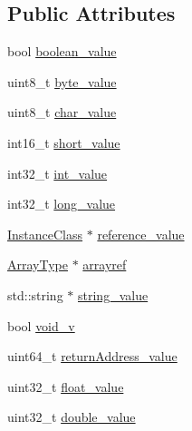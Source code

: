\subsection*{Public Attributes}
\begin{DoxyCompactItemize}
\item 
bool \hyperlink{unionLocal__var__Type__u_a8f386ab2284fc8e9828a136a9e15848b}{boolean\+\_\+value}
\item 
uint8\+\_\+t \hyperlink{unionLocal__var__Type__u_ad22519961e7ca09ba8135f4bab5cc677}{byte\+\_\+value}
\item 
uint8\+\_\+t \hyperlink{unionLocal__var__Type__u_ab245a6a8a84be391e7d1998b1eaf5f25}{char\+\_\+value}
\item 
int16\+\_\+t \hyperlink{unionLocal__var__Type__u_ac5a77877e9ddb59fe44eb9460facbec0}{short\+\_\+value}
\item 
int32\+\_\+t \hyperlink{unionLocal__var__Type__u_a26562ff158d1192e2caf14eebe1f2e51}{int\+\_\+value}
\item 
int32\+\_\+t \hyperlink{unionLocal__var__Type__u_a7968ab39ec644a73b48edc3d3c0886a5}{long\+\_\+value}
\item 
\hyperlink{classInstanceClass}{Instance\+Class} $\ast$ \hyperlink{unionLocal__var__Type__u_a5159fcf16992d633c01263fdebb6f00a}{reference\+\_\+value}
\item 
\hyperlink{heap_8hpp_aa630024ee56aa81525646e18ddf60284}{Array\+Type} $\ast$ \hyperlink{unionLocal__var__Type__u_aa8e32f1911fc076a74749f5bcef8c480}{arrayref}
\item 
std\+::string $\ast$ \hyperlink{unionLocal__var__Type__u_ab9de5f06b94aff07f7e6187620c94935}{string\+\_\+value}
\item 
bool \hyperlink{unionLocal__var__Type__u_a8e62ef040320789080808dcdea5eb550}{void\+\_\+v}
\item 
uint64\+\_\+t \hyperlink{unionLocal__var__Type__u_aea0859d955fccc0e64ffb14966f91723}{return\+Address\+\_\+value}
\item 
uint32\+\_\+t \hyperlink{unionLocal__var__Type__u_ada2db4aad621fbf52bd05dc663e491f0}{float\+\_\+value}
\item 
uint32\+\_\+t \hyperlink{unionLocal__var__Type__u_a9da402ea2473492fe9badcb562a4b117}{double\+\_\+value}
\end{DoxyCompactItemize}


